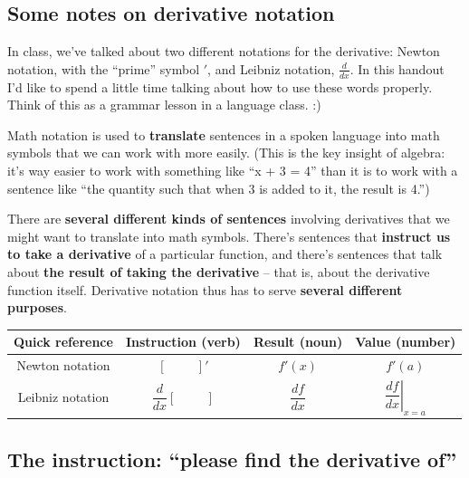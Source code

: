 
\setlength{\parskip}{.2cm}


 \begin{center}
        \subsection*{Some notes on derivative notation}
    \end{center}
    
    In class, we've talked about two different notations for the derivative: Newton notation, with the ``prime'' symbol $'$, and Leibniz notation, $\tfrac{d}{dx}$. In this handout I'd like to spend a little time talking about how to use these words properly. Think of this as a grammar lesson in a language class. :)
    
    Math notation is used to \textbf{translate} sentences in a spoken language into math symbols that we can work with more easily. (This is the key insight of algebra: it's way easier to work with something like ``x + 3 = 4'' than it is to work with a sentence like ``the quantity such that when 3 is added to it, the result is 4.'')
    
    There are \textbf{several different kinds of sentences} involving derivatives that we might want to translate into math symbols. There's sentences that \textbf{instruct us to take a derivative} of a particular function, and there's sentences that talk about \textbf{the result of taking the derivative} -- that is, about the derivative function itself. Derivative notation thus has to serve \textbf{several different purposes}.

\begin{center}
\def\arraystretch{2.0}
\begin{tabular}{c|c|c|c}
\textbf{Quick reference} & Instruction (verb) & Result (noun) & Value (number)\\\hline
Newton notation  & $[\hspace{1cm}]'$            & $f'(x)$         & $f'(a)$                            \\\hline
Leibniz notation & $\dfrac{d}{dx}[\hspace{1cm}]$ & $\dfrac{df}{dx}$ & $\left.\dfrac{df}{dx}\right|_{x=a}$
\end{tabular}
\end{center}
    
    \subsection*{The instruction: ``please find the derivative of''}
    
